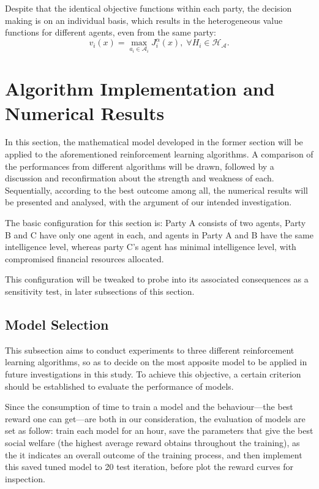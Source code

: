 \documentclass[11pt,twoside]{article}
\numberwithin{Theorem}{section}
\numberwithin{Definition}{section}
\numberwithin{Lemma}{section}
\numberwithin{Algorithm}{section}
\numberwithin{equation}{section}
\begin{document}
Despite that the identical objective functions within each party, the decision making is on an individual basis, which results in the heterogeneous value functions for different agents, even from the same party:
$$
v_i(x)=\max_{a_i\in\mathcal{A}_i}J_i^{\alpha}(x),\;\forall H_i\in\mathcal{H_A}.
$$
\clearpage



\section{Algorithm Implementation and Numerical Results}
In this section, the mathematical model developed in the former section will be applied to the aforementioned reinforcement learning algorithms. A comparison of the performances from different algorithms will be drawn, followed by a discussion and reconfirmation about the strength and weakness of each. Sequentially, according to the best outcome among all, the numerical results will be presented and analysed, with the argument of our intended investigation.

The basic configuration for this section is: Party A consists of two agents, Party B and C have only one agent in each, and agents in Party A and B have the same intelligence level, whereas party C's agent has minimal intelligence level, with compromised financial resources allocated.

This configuration will be tweaked to probe into its associated consequences as a sensitivity test, in later subsections of this section.
\clearpage

\subsection{Model Selection}
This subsection aims to conduct experiments to three different reinforcement learning algorithms, so as to decide on the most apposite model to be applied in future investigations in this study. To achieve this objective, a certain criterion should be established to evaluate the performance of models. 

Since the consumption of time to train a model and the behaviour—the best reward one can get—are both in our consideration, the evaluation of models are set as follow: train each model for an hour, save the parameters that give the best social welfare (the highest average reward obtains throughout the training), as the it indicates an overall outcome of the training process, and then implement this saved tuned model to 20 test iteration, before plot the reward curves for inspection.
\end{document}
